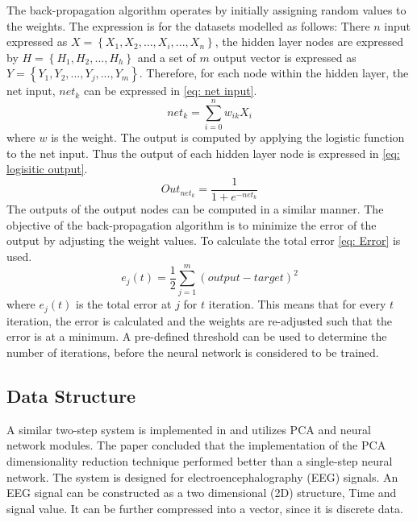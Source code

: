 \documentclass[11pt,twocolumn]{witseiepaper}
\begin{document}
	The back-propagation algorithm operates by initially assigning random values to the weights. The expression is for the datasets modelled as follows: 
	\newline
	There $n$ input expressed as
	\newline
	$X = \left\{X_1, X_2, ... , X_i, ..., X_n\right\}$, the hidden layer nodes are expressed by $H = \left\{H_1, H_2, ... , H_h\right\}$ and a set of $m$ output vector is expressed as $Y = \left\{Y_1, Y_2, ... , Y_j, ... , Y_m\right\}$. Therefore, for each node within the hidden layer, the net input, $net_{k}$ can be expressed in \eqref{eq: net input}.
	\begin{equation}
		\label{eq: net input}
		net_{k} = \sum_{i = 0}^{n} w_{ik} X_i
	\end{equation}
	where $w$ is the weight.
	\newline
	The output is computed by applying the logistic function to the net input. Thus the output of each hidden layer node is expressed in \eqref{eq: logisitic output}.
	\begin{equation}
		\label{eq: logisitic output}
		Out_{net_k} = \frac{1}{1 + e^{-net_k}}
	\end{equation}
	The outputs of the output nodes can be computed in a similar manner. The objective of the back-propagation algorithm is to minimize the error of the output by adjusting the weight values. To calculate the total error \eqref{eq: Error} is used.
	\begin{equation}
		\label{eq: Error}
		e_j(t) = \frac{1}{2} \sum_{j = 1}^{m} (output - target)^2
	\end{equation}
	where $e_j(t)$ is the total error at $j$ for $t$ iteration. 
	\newline
	This means that for every $t$ iteration, the error is calculated and the weights are re-adjusted such that the error is at a minimum. A pre-defined threshold can be used to determine the number of iterations, before the neural network is considered to be trained.
	
	\subsection{Data Structure}
	A similar two-step system is implemented in \cite{kottaimalai_eeg_2013} and utilizes PCA and neural network modules. The paper concluded that the implementation of the PCA dimensionality reduction technique performed better than a single-step neural network. The system is designed for electroencephalography (EEG) signals. An EEG signal can be constructed as a two dimensional (2D) structure, Time and signal value. It can be further compressed into a vector, since it is discrete data. 
	
\end{document}
